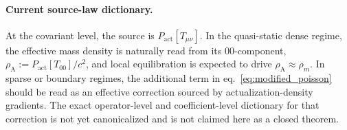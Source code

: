 \paragraph{Current source-law dictionary.}
At the covariant level, the source is $P_{\mathrm{act}}[T_{\mu\nu}]$. In the quasi-static dense regime, the effective mass density is naturally read from its $00$-component, $\rho_{\mathrm{A}} := P_{\mathrm{act}}[T_{00}]/c^2$, and local equilibration is expected to drive $\rho_{\mathrm{A}} \approx \rho_m$. In sparse or boundary regimes, the additional term in eq.~\ref{eq:modified_poisson} should be read as an effective correction sourced by actualization-density gradients. The exact operator-level and coefficient-level dictionary for that correction is not yet canonicalized and is not claimed here as a closed theorem.
